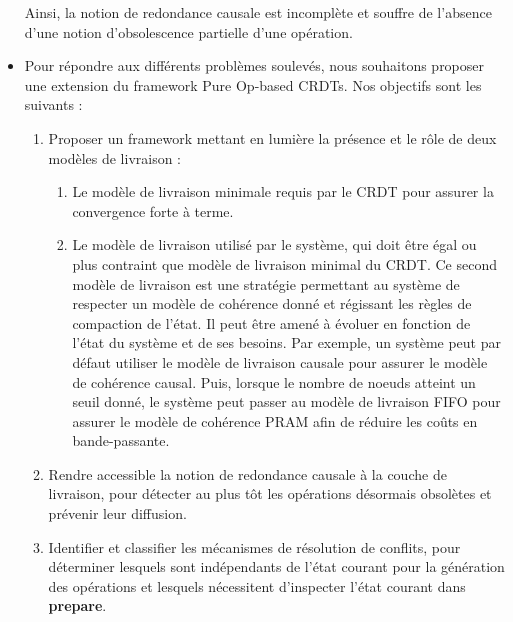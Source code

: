 \begin{itemize}
        Ainsi, la notion de redondance causale est incomplète et souffre de l'absence d'une notion d'obsolescence partielle d'une opération.
    \item Pour répondre aux différents problèmes soulevés, nous souhaitons proposer une extension du framework Pure Op-based \acp{CRDT}.
        Nos objectifs sont les suivants :
        \begin{enumerate}
            \item Proposer un framework mettant en lumière la présence et le rôle de deux modèles de livraison :
                \begin{enumerate}
                    \item Le modèle de livraison minimale requis par le \ac{CRDT} pour assurer la convergence forte à terme.
                    \item Le modèle de livraison utilisé par le système, qui doit être égal ou plus contraint que modèle de livraison minimal du \ac{CRDT}.
                        Ce second modèle de livraison est une stratégie permettant au système de respecter un modèle de cohérence donné et régissant les règles de compaction de l'état.
                        Il peut être amené à évoluer en fonction de l'état du système et de ses besoins.
                        Par exemple, un système peut par défaut utiliser le modèle de livraison causale pour assurer le modèle de cohérence causal.
                        Puis, lorsque le nombre de noeuds atteint un seuil donné, le système peut passer au modèle de livraison FIFO pour assurer le modèle de cohérence PRAM afin de réduire les coûts en bande-passante.
                \end{enumerate}
            \item Rendre accessible la notion de redondance causale à la couche de livraison, pour détecter au plus tôt les opérations désormais obsolètes et prévenir leur diffusion.
            \item Identifier et classifier les mécanismes de résolution de conflits, pour déterminer lesquels sont indépendants de l'état courant pour la génération des opérations et lesquels nécessitent d'inspecter l'état courant dans \textbf{prepare}.
        \end{enumerate}
\end{itemize}
